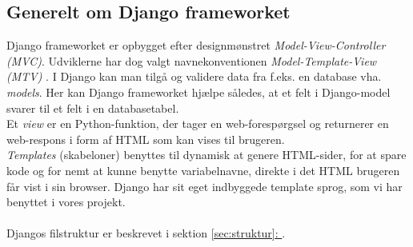 \documentclass[12pt]{article}
\begin{document}
\subsection{Generelt om Django frameworket}
\label{sec:genereltdjango}
Django frameworket er opbygget efter designmønstret \textit{Model-View-Controller (MVC)}. Udviklerne har dog valgt navnekonventionen \textit{Model-Template-View (MTV)} \cite{djangoFAQ}. I Django kan man tilgå og validere data fra f.eks. en database vha. \textit{models}\cite{models}. Her kan Django frameworket hjælpe således, at et felt i Django-model svarer til et felt i en databasetabel. \\
Et \textit{view}\cite{djangoView} er en Python-funktion, der tager en web-forespørgsel og returnerer en web-respons i form af HTML som kan vises til brugeren. \\
\textit{Templates} (skabeloner) benyttes til dynamisk at genere HTML-sider, for at spare kode og for nemt at kunne benytte variabelnavne, direkte i det HTML brugeren får vist i sin browser. Django har sit eget indbyggede template sprog\cite{djangoTemplate}, som vi har benyttet i vores projekt.\\
\\
Djangos filstruktur er beskrevet i sektion \hyperref[sec:struktur]{\ref*{sec:struktur}: }.
\end{document}
